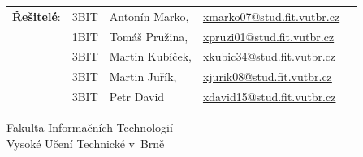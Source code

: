 \begin{titlepage}
\begin{flushleft}
\begin{tabular}{l l l l l}
\textbf{Řešitelé}: 
&3BIT& Antonín Marko, &\url{xmarko07@stud.fit.vutbr.cz} \\
&1BIT& Tomáš Pružina, &\url{xpruzi01@stud.fit.vutbr.cz} \\
&3BIT& Martin Kubíček, &\url{xkubic34@stud.fit.vutbr.cz} \\
&3BIT& Martin Juřík, &\url{xjurik08@stud.fit.vutbr.cz} \\
&3BIT& Petr David &\url{xdavid15@stud.fit.vutbr.cz} \\
\end{tabular}
\vfill
\begin{large}
Fakulta Informačních Technologií \\
Vysoké Učení Technické v~Brně \\
\end{large}
\end{flushleft}
\end{titlepage}
